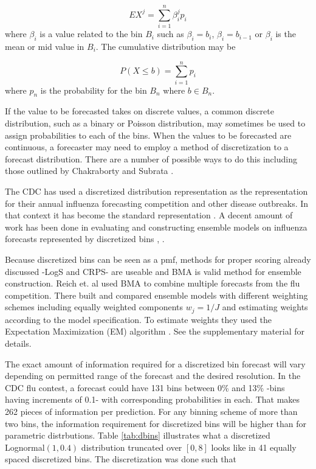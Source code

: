 \documentclass{article}\usepackage[]{graphicx}\usepackage[]{color}
\begin{document}
\begin{equation}
\label{eq:bev}
  EX^j = \sum_{i=1}^n \beta_i^j p_i
\end{equation}
where $\beta_i$ is a value related to the bin $B_i$ such as $\beta_i = b_i$,
$\beta_i = b_{i-1}$ or $\beta_i$ is the mean or mid value in $B_i$. The 
cumulative distribution may be

\begin{equation}
\label{eq:bcdf}
  P(X \leq b) = \sum_{i=1}^n p_i
\end{equation}
where $p_n$ is the probability for the bin $B_n$ where $b \in B_n$.

If the value to be forecasted takes on discrete values, a common discrete 
distribution, such as a binary or Poisson distribution, may sometimes be used to 
assign probabilities to each of the bins. When the values to be forecasted are
continuous, a forecaster may need to employ a method of discretization to a 
forecast distribution. There are a number of possible ways to do this including
those outlined by Chakraborty and Subrata \cite{chakraborty2015generating}.

The CDC has used a discretized distribution representation as the representation
for their annual influenza forecasting competition and other disease outbreaks.
In that context it has become the standard representation 
\cite{brooks2020comparing}. A decent amount of work has been done in evaluating 
and constructing ensemble models on influenza forecasts represented by 
discretized bins \cite{mcgowan2019collaborative}, \cite{mcandrew2019adaptively}
\cite{reich2019collaborative}. 

Because discretized bins can be seen as a pmf, methods for proper scoring 
already 
discussed -LogS and CRPS- are useable and BMA is valid method for ensemble 
construction. Reich et. al used BMA to combine multiple forecasts from the flu 
competition. There built and compared ensemble models with different weighting
schemes including equally weighted components $w_j = 1/J$ and estimating weights
according to the model specification. To estimate weights they used the 
Expectation Maximization (EM) algorithm \cite{reich2019accuracy}. See the
supplementary material for details. 

The exact amount of information required for a discretized bin forecast will 
vary depending on permitted range of the forecast and the desired resolution. 
In the CDC flu contest, a forecast could have 131 bins between 0\% and 13\% 
-bins having increments of 0.1- with 
corresponding probabilities in each. That makes 262 pieces of information per
prediction. For any binning scheme of more than two bins, the information 
requirement for discretized bins will be higher than for parametric distrbutions.
Table \ref{tab:dbins} illustrates what a discretized 
Lognormal$(1,0.4)$ distribution truncated over $[0,8]$
looks like in 41 equally spaced discretized bins. The discretization was done
such that 
\end{document}
